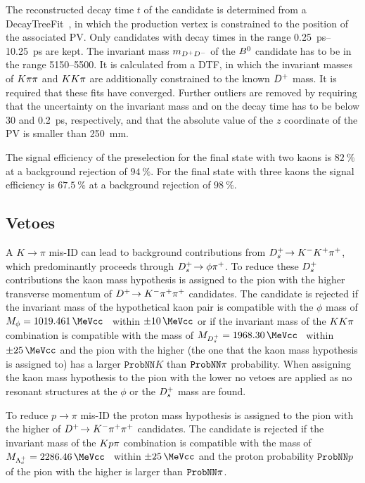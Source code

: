 The reconstructed decay time $t$ of the \Bd candidate is determined from a
DecayTreeFit~\cite{Hulsbergen:2005pu}, in which the \Bd production vertex is
constrained to the position of the associated PV. Only candidates with decay
times in the range \SIrange{0.25}{10.25}{\ps} are kept. The invariant mass
$m_{{{D}^+}{{D}^-}}$ of the ${{B}^0}$ candidate has to be in the range
\SIrange{5150}{5500}{\MeVcc}. It is calculated from a DTF, in which the
invariant masses of $K\pi\pi$ and $KK\pi$ are additionally constrained to the
known ${{D}^+}$ mass. It is required that these fits have converged. Further
outliers are removed by requiring that the uncertainty on the invariant mass
and on the decay time has to be below \SI{30}{\MeVcc} and \SI{0.2}{\ps},
respectively, and that the absolute value of the $z$ coordinate of the PV is
smaller than \SI{250}{\milli\meter}.

The signal efficiency of the preselection for the final state with two kaons
is $\SI{82}{\percent}$ at a background rejection of $\SI{94}{\percent}$. For
the final state with three kaons the signal efficiency is
$\SI{67.5}{\percent}$ at a background rejection of $\SI{98}{\percent}$.

\subsection{Vetoes}
\label{sec:b02dd:selection:vetoes}

A $K\rightarrow\pi$ mis-ID can lead to background contributions from
${{D}^+_{s}}\!\rightarrow {\ensuremath{{K}^-}}{\ensuremath{{K}^+}}{\ensuremath{{\pi}^+}}$, which predominantly proceeds through ${{D}^+_{s}}\!\rightarrow \phi{\ensuremath{{\pi}^+}}$. To reduce
these ${{D}^+_{s}}$ contributions the kaon mass hypothesis is assigned to the pion
with the higher transverse momentum of ${{D}^+}\!\rightarrow {\ensuremath{{K}^-}}{\ensuremath{{\pi}^+}}{\ensuremath{{\pi}^+}}$ candidates. The candidate
is rejected if the invariant mass of the hypothetical kaon pair is compatible
with the $\phi$ mass of $M_{\phi} = \SI{1019.461}{\MeVcc}$~\cite{PDG2014}
within $\pm\SI{10}{\MeVcc}$ or if the invariant mass of the ${K}{K}{\pi}$
combination is compatible with the \Dsp mass of $M_{\Dsp} =
\SI{1968.30}{\MeVcc}$~\cite{PDG2014} within $\pm\SI{25}{\MeVcc}$ and the pion
with the higher \pT (the one that the kaon mass hypothesis is assigned to) has
a larger $\texttt{ProbNN}K$ than $\texttt{ProbNN}{\ensuremath{\pi}}$ probability. When
assigning the kaon mass hypothesis to the pion with the lower \pT no vetoes
are applied as no resonant structures at the $\phi$ or the ${{D}^+_{s}}$ mass are
found.

To reduce $p\rightarrow\pi$ mis-ID the proton mass hypothesis is assigned to
the pion with the higher \pT of ${{D}^+}\!\rightarrow {\ensuremath{{K}^-}}{\ensuremath{{\pi}^+}}{\ensuremath{{\pi}^+}}$ candidates. The candidate is
rejected if the invariant mass of the ${K}{p}{\pi}$ combination is
compatible with the \Lc mass of $M_{\Lc} =
\SI{2286.46}{\MeVcc}$~\cite{PDG2014} within $\pm\SI{25}{\MeVcc}$ and the
proton probability $\texttt{ProbNN}p$ of the pion with the higher \pT is
larger than $\texttt{ProbNN}{\ensuremath{\pi}}$.


